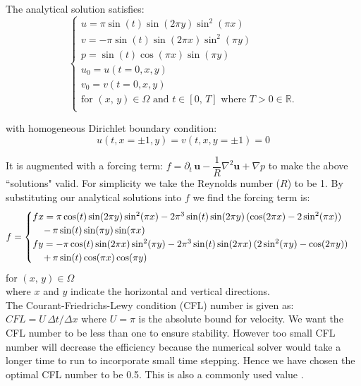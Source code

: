 The analytical solution satisfies:
\begin{equation}
\begin{cases}
u = \pi\sin(t)\sin(2\pi y)\sin^2(\pi x)\\
v = - \pi \sin(t)\sin(2\pi x)\sin^2(\pi y)\\
p = \sin(t)\cos(\pi x)\sin(\pi y)\\
u_0 = u(t=0,x,y)\\
v_0 = v(t=0,x,y)\\
\text{for $(x,\,y) \in \Omega$ and $t \in [0,\,T]$ where $T > 0 \in \mathbb{R}$}.\\
\end{cases}
\end{equation}

with homogeneous Dirichlet boundary condition:
\begin{equation*}
u(t, x=\pm 1, y) = v(t, x,y= \pm 1) = 0
\end{equation*}

It is augmented with a forcing term: $f = \partial_t\,\textbf{u} - \dfrac{1}{R}\nabla^2 \textbf{u} + \nabla p$ to make the above ``solutions" valid. For simplicity we take the Reynolds number ($R$) to be 1. By substituting our analytical solutions into $f$ we find the forcing term is:
\begin{equation}
f = 
\begin{cases}
fx = \pi\cos(t)\sin(2\pi y)\sin^2(\pi x) -  2 \pi^3\sin(t)\sin(2\pi y)\,(\cos(2\pi x) - 2\sin^2(\pi x)) \\
\,\,\,\,\,\,\,- \, \pi\sin(t)\sin(\pi y)\sin(\pi x) \\
fy = - \pi\cos(t)\sin(2\pi x)\sin^2(\pi y) - 2\pi^3\sin(t)\sin(2\pi x)\,(2\sin^2(\pi y) - \cos(2\pi y)) \\
\,\,\,\,\,\,\,+ \, \pi\sin(t)\cos(\pi x)\cos(\pi y)\\
\end{cases}\\
\end{equation}
for $(x,\,y) \in \Omega$\\
where $x$ and $y$ indicate the horizontal and vertical directions.\\
The Courant-Friedrichs-Lewy condition (CFL) number is given as: $CFL = U\,\Delta t/\Delta x$ where $U = \pi$ is the absolute bound for velocity. We want the CFL number to be less than one to ensure stability. However too small CFL number will decrease the efficiency because the numerical solver would take a longer time to run to incorporate small time stepping. Hence we have chosen the optimal CFL number to be 0.5. This is also a commonly used value \cite{brown2001accurate}.

